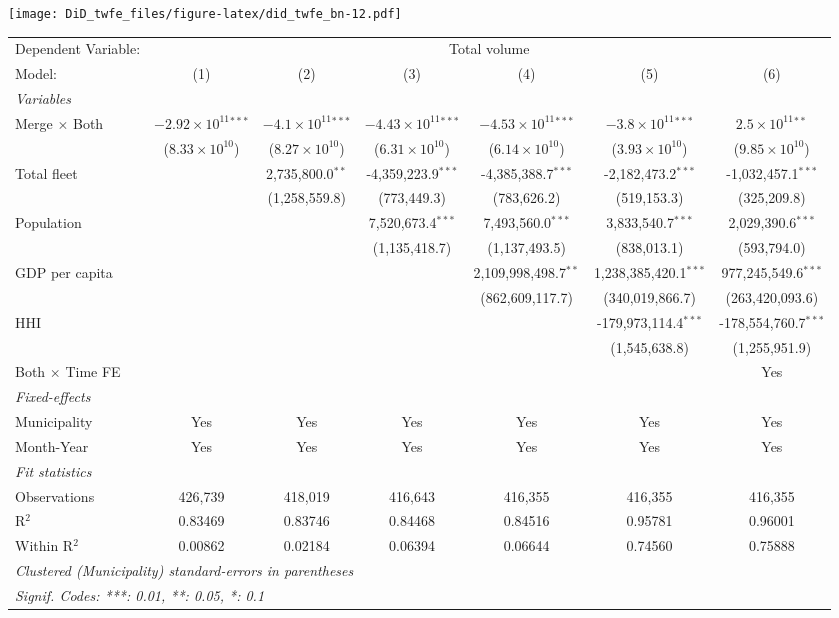 \documentclass[
]{article}
\begin{document}
\texttt{[image: DiD\_twfe\_files/figure-latex/did\_twfe\_bn-12.pdf]}

\begin{tabular}{lcccccc}
\tabularnewline\midrule\midrule
Dependent Variable:&\multicolumn{6}{c}{Total volume}\\
Model:&(1) & (2) & (3) & (4) & (5) & (6)\\
\midrule \emph{Variables}&   &   &   &   &   &  \\
Merge $\times $ Both & $-2.92\times 10^{11}$$^{***}$ & $-4.1\times 10^{11}$$^{***}$ & $-4.43\times 10^{11}$$^{***}$ & $-4.53\times 10^{11}$$^{***}$ & $-3.8\times 10^{11}$$^{***}$ & $2.5\times 10^{11}$$^{**}$\\
  &($8.33\times 10^{10}$) & ($8.27\times 10^{10}$) & ($6.31\times 10^{10}$) & ($6.14\times 10^{10}$) & ($3.93\times 10^{10}$) & ($9.85\times 10^{10}$)\\
Total fleet &    & 2,735,800.0$^{**}$ & -4,359,223.9$^{***}$ & -4,385,388.7$^{***}$ & -2,182,473.2$^{***}$ & -1,032,457.1$^{***}$\\
  &   & (1,258,559.8) & (773,449.3) & (783,626.2) & (519,153.3) & (325,209.8)\\
Population &    &    & 7,520,673.4$^{***}$ & 7,493,560.0$^{***}$ & 3,833,540.7$^{***}$ & 2,029,390.6$^{***}$\\
  &   &    & (1,135,418.7) & (1,137,493.5) & (838,013.1) & (593,794.0)\\
GDP per capita &    &    &    & 2,109,998,498.7$^{**}$ & 1,238,385,420.1$^{***}$ & 977,245,549.6$^{***}$\\
  &   &    &    & (862,609,117.7) & (340,019,866.7) & (263,420,093.6)\\
HHI &    &    &    &    & -179,973,114.4$^{***}$ & -178,554,760.7$^{***}$\\
  &   &    &    &    & (1,545,638.8) & (1,255,951.9)\\
Both $\times$ Time FE &  &  &  &  &  & Yes\\
\midrule \emph{Fixed-effects}&   &   &   &   &   &  \\
Municipality & Yes & Yes & Yes & Yes & Yes & Yes\\
Month-Year & Yes & Yes & Yes & Yes & Yes & Yes\\
\midrule \emph{Fit statistics}&  & & & & & \\
Observations & 426,739&418,019&416,643&416,355&416,355&416,355\\
R$^2$ & 0.83469&0.83746&0.84468&0.84516&0.95781&0.96001\\
Within R$^2$ & 0.00862&0.02184&0.06394&0.06644&0.74560&0.75888\\
\midrule\midrule\multicolumn{7}{l}{\emph{Clustered (Municipality) standard-errors in parentheses}}\\
\multicolumn{7}{l}{\emph{Signif. Codes: ***: 0.01, **: 0.05, *: 0.1}}\\
\end{tabular}
\end{document}
